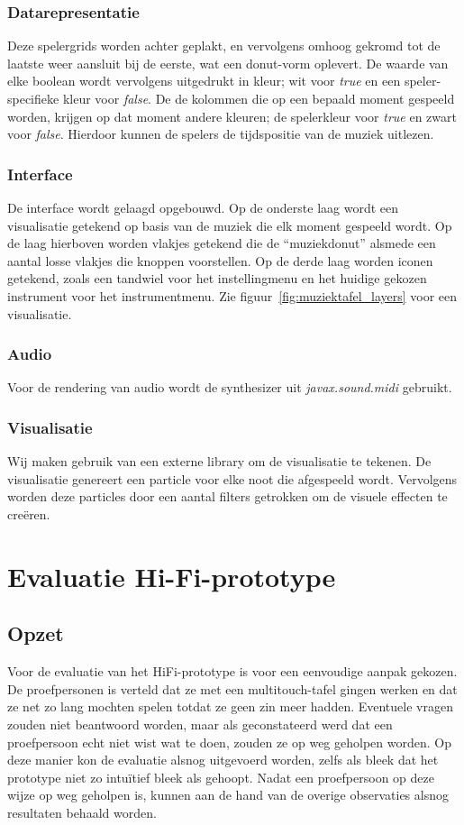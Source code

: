 \documentclass{acm}
\begin{document}
\subsubsection{Datarepresentatie}
Deze spelergrids worden achter geplakt, en vervolgens omhoog gekromd tot de laatste weer aansluit bij de eerste, wat een donut-vorm oplevert. De waarde van elke boolean wordt vervolgens uitgedrukt in kleur; wit voor \textit{true} en een speler-specifieke kleur voor \textit{false}. De de kolommen die op een bepaald moment gespeeld worden, krijgen op dat moment andere kleuren; de spelerkleur voor \textit{true} en zwart voor \textit{false}. Hierdoor kunnen de spelers de tijdspositie van de muziek uitlezen.

\subsubsection{Interface}
De interface wordt gelaagd opgebouwd. Op de onderste laag wordt een visualisatie getekend op basis van de muziek die elk moment gespeeld wordt. Op de laag hierboven worden vlakjes getekend die de “muziekdonut” alsmede een aantal losse vlakjes die knoppen voorstellen. Op de derde laag worden iconen getekend, zoals een tandwiel voor het instellingmenu en het huidige gekozen instrument voor het instrumentmenu. Zie figuur~\ref{fig:muziektafel_layers} voor een visualisatie.

\subsubsection{Audio}
Voor de rendering van audio wordt de synthesizer uit \textit{javax.sound.midi} gebruikt.

\subsubsection{Visualisatie}
Wij maken gebruik van een externe library om de visualisatie te tekenen. De visualisatie genereert een particle voor elke noot die afgespeeld wordt. Vervolgens worden deze particles door een aantal filters getrokken om de visuele effecten te cre\"eren.


\section{Evaluatie Hi-Fi-prototype}
\label{sec_evaluatie}

\subsection{Opzet}
Voor de evaluatie van het HiFi-prototype is voor een eenvoudige aanpak gekozen. De proefpersonen is verteld dat ze met een multitouch-tafel gingen werken en dat ze net zo lang mochten spelen totdat ze geen zin meer hadden. Eventuele vragen zouden niet beantwoord worden, maar als geconstateerd werd dat een proefpersoon echt niet wist wat te doen, zouden ze op weg geholpen worden. Op deze manier kon de evaluatie alsnog uitgevoerd worden, zelfs als bleek dat het prototype niet zo intu\"itief bleek als gehoopt. Nadat een proefpersoon op deze wijze op weg geholpen is, kunnen aan de hand van de overige observaties alsnog resultaten behaald worden.
\end{document}
